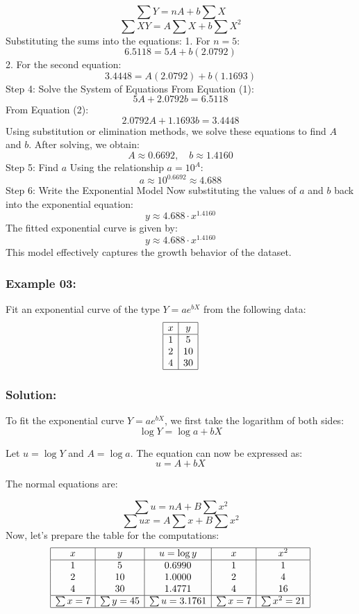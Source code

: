 \documentclass[12pt]{article}
\begin{document}
\[
\sum Y = nA + b \sum X
\]
\[
\sum XY = A \sum X + b \sum X^2
\]
Substituting the sums into the equations:
1. For \(n = 5\):
\[
6.5118 = 5A + b(2.0792) \tag{1}
\]
2. For the second equation:
\[
3.4448 = A(2.0792) + b(1.1693) \tag{2}
\]
Step 4: Solve the System of Equations
From Equation (1):
\[
5A + 2.0792b = 6.5118
\]
From Equation (2):
\[
2.0792A + 1.1693b = 3.4448
\]
Using substitution or elimination methods, we  solve these equations to find \(A\) and \(b\).
After solving, we obtain:
\[
A \approx 0.6692, \quad b \approx 1.4160
\]
Step 5: Find \(a\)
Using the relationship \(a = 10^A\):
\[
a \approx 10^{0.6692} \approx 4.688
\]
Step 6: Write the Exponential Model
Now substituting the values of \(a\) and \(b\) back into the exponential equation:
\[
y \approx 4.688 \cdot x^{1.4160}
\]
The fitted exponential curve is given by:
\[
y \approx 4.688 \cdot x^{1.4160}
\]
This model effectively captures the growth behavior of the dataset.
\subsubsection*{\hspace{0.5cm}Example 03:}
Fit an exponential curve of the type \( Y = ae^{bX} \) from the following data:
\[
\begin{array}{|c|c|}
\hline
x & y \\
\hline
1 & 5 \\
2 & 10 \\
4 & 30 \\
\hline
\end{array}
\]
\subsubsection*{\hspace{0.5cm}Solution:}
To fit the exponential curve \( Y = ae^{bX} \), we first take the logarithm of both sides:
\[
\log Y = \log a + bX
\]

Let \( u = \log Y \) and \( A = \log a \). The equation can now be expressed as:
\[
u = A + bX
\]

The normal equations are:

\[
\sum u = nA + B\sum x^2
\]
\[
\sum ux = A\sum x + B\sum x^2
\]
Now, let's prepare the table for the computations:
\[
\begin{array}{|c|c|c|c|c|}
\hline
x & y & u = \log y & x & x^2 \\
\hline
1 & 5 & 0.6990 & 1 & 1 \\
2 & 10 & 1.0000 & 2 & 4 \\
4 & 30 & 1.4771 & 4 & 16 \\
\hline
\sum x = 7 & \sum y = 45 & \sum u = 3.1761 & \sum x = 7 & \sum x^2 = 21 \\
\hline
\end{array}
\]
\end{document}
